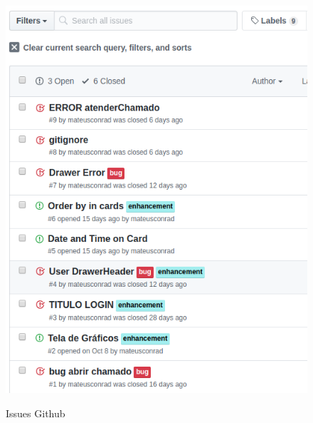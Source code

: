  \begin{figure}[htb]
     \caption{Issues Github}
     \centering
     \begin{frame}{
     \includegraphics [scale = 0.6]{img/issues_github}}
     \end{frame}
     \label{fig:issues_github}
 \end{figure}
    